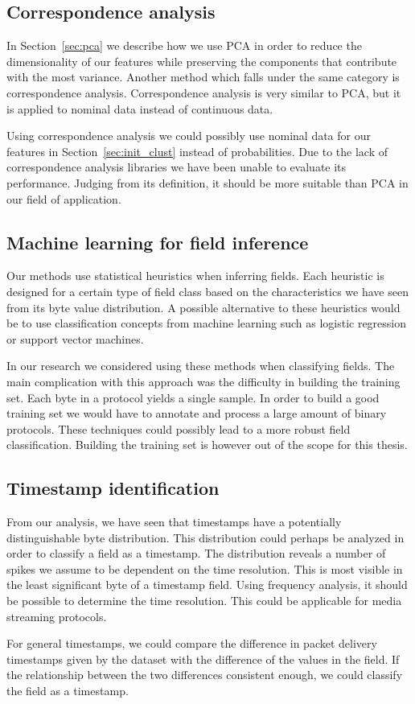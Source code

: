 \documentclass[a4paper]{report}
\begin{document}
\subsection{Correspondence analysis}
In Section~\ref{sec:pca} we describe how we use PCA in order to reduce the
dimensionality of our features while preserving the components that contribute
with the most variance. Another method which falls under the same category is
correspondence analysis. Correspondence analysis is very similar to PCA, but
it is applied to nominal data instead of continuous data.

Using correspondence analysis we could possibly use nominal data for our
features in Section~\ref{sec:init_clust} instead of probabilities. Due to the
lack of correspondence analysis libraries we have been unable to evaluate its
performance. Judging from its definition, it should be more suitable than PCA
in our field of application.

\subsection{Machine learning for field inference}
Our methods use statistical heuristics when inferring fields. Each heuristic
is designed for a certain type of field class based on the characteristics we
have seen from its byte value distribution. A possible alternative to these
heuristics would be to use classification concepts from machine learning such
as logistic regression or support vector machines.

In our research we considered using these methods when classifying fields.
The main complication with this approach was the difficulty in building the
training set. Each byte in a protocol yields a single sample. In order to
build a good training set we would have to annotate and process a large
amount of binary protocols. These techniques could possibly lead to a
more robust field classification. Building the training set is however out
of the scope for this thesis.

\subsection{Timestamp identification}
From our analysis, we have seen that timestamps have a potentially
distinguishable byte distribution. This distribution could perhaps be analyzed
in order to classify a field as a timestamp. The distribution reveals a number
of spikes we assume to be dependent on the time resolution. This is most
visible in the least significant byte of a timestamp field. Using frequency
analysis, it should be possible to determine the time resolution. This could
be applicable for media streaming protocols.

For general timestamps, we could compare the difference in packet delivery
timestamps given by the dataset with the difference of the values in the field.
If the relationship between the two differences consistent enough, we could
classify the field as a timestamp.



\end{document}
